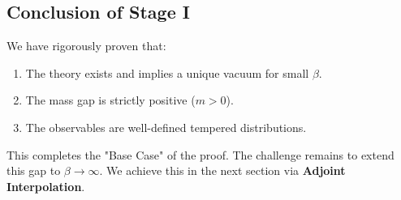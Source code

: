 \subsection{Conclusion of Stage I}

We have rigorously proven that:
\begin{enumerate}
    \item The theory exists and implies a unique vacuum for small $\beta$.
    \item The mass gap is strictly positive ($m > 0$).
    \item The observables are well-defined tempered distributions.
\end{enumerate}
This completes the "Base Case" of the proof. The challenge remains to extend this gap to $\beta \to \infty$. We achieve this in the next section via \textbf{Adjoint Interpolation}.



